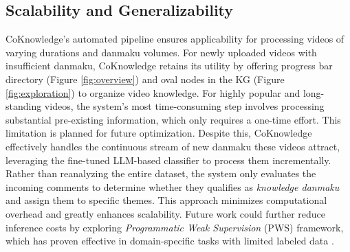 \subsection{Scalability and Generalizability}


CoKnowledge’s automated pipeline ensures applicability for processing videos of varying durations and danmaku volumes. For newly uploaded videos with insufficient danmaku, CoKnowledge retains its utility by offering progress bar directory (Figure \ref{fig:overview}) and oval nodes in the KG (Figure \ref{fig:exploration}) to organize video knowledge. For highly popular and long-standing videos, the system’s most time-consuming step involves processing substantial pre-existing information, which only requires a one-time effort. This limitation is planned for future optimization. Despite this, CoKnowledge effectively handles the continuous stream of new danmaku these videos attract, leveraging the fine-tuned LLM-based classifier to process them incrementally. Rather than reanalyzing the entire dataset, the system only evaluates the incoming comments to determine whether they qualifies as \textit{knowledge danmaku} and assign them to specific themes. This approach minimizes computational overhead and greatly enhances scalability. Future work could further reduce inference costs by exploring \textit{Programmatic Weak Supervision} (PWS) framework, which has proven effective in domain-specific tasks with limited labeled data \cite{li2024labelaid}.



